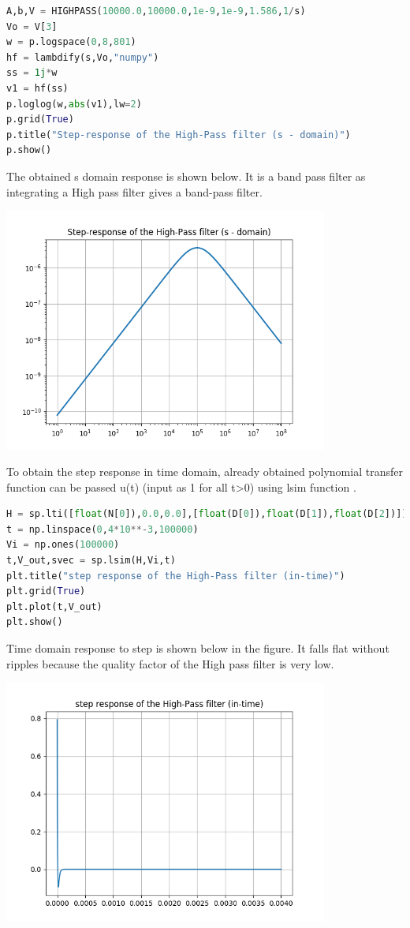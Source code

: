 \documentclass[a4paper]{article}
\begin{document}
\begin{lstlisting}[language=Python]
A,b,V = HIGHPASS(10000.0,10000.0,1e-9,1e-9,1.586,1/s)
Vo = V[3]
w = p.logspace(0,8,801)
hf = lambdify(s,Vo,"numpy")
ss = 1j*w
v1 = hf(ss)
p.loglog(w,abs(v1),lw=2)
p.grid(True)
p.title("Step-response of the High-Pass filter (s - domain)")
p.show()

\end{lstlisting}
The obtained s domain response is shown below. It is a band pass filter as integrating a High pass filter gives a band-pass filter.
\begin{center}
\includegraphics[width=0.8\textwidth]{Figure_9.png}
\end{center}

To obtain the step response in time domain, already obtained polynomial transfer function can be passed u(t) (input as 1 for all t>0) using lsim function .
\begin{lstlisting}[language=Python]
H = sp.lti([float(N[0]),0.0,0.0],[float(D[0]),float(D[1]),float(D[2])])
t = np.linspace(0,4*10**-3,100000)
Vi = np.ones(100000)
t,V_out,svec = sp.lsim(H,Vi,t)
plt.title("step response of the High-Pass filter (in-time)")
plt.grid(True)
plt.plot(t,V_out) 
plt.show()
\end{lstlisting}
Time domain response to step is shown below in the figure. It falls flat  without ripples because the quality factor of the High pass filter is very low.
\begin{center}
\includegraphics[width=0.8\textwidth]{Figure_10.png}
\end{center}
\end{document}
